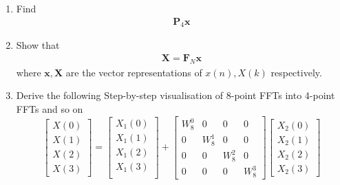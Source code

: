 \documentclass[journal,12pt,twocolumn]{IEEEtran}
\let\vec\mathbf
\renewcommand\thesection{\arabic{section}}
\begin{document}
\begin{enumerate}[label=\arabic*.,ref=\thesection.\theenumi]
\item Find 
    \begin{align}
	     \vec{P}_4 \vec{x}
    \end{align}
\item Show that 
    \begin{align}
	    \vec{X} = \vec{F}_N \vec{x}
	    \label{eq:dft-mat-def}
    \end{align}
		where $\vec{x}, \vec{X}$ are the vector representations of $x(n), X(k)$ respectively.
\item Derive the following Step-by-step visualisation  of
8-point FFTs into 4-point FFTs and so on
\begin{equation}
\begin{bmatrix}
X(0) \\ 
X(1) \\ 
X(2) \\ 
X(3)
\end{bmatrix}
=
\begin{bmatrix}
X_{1}(0) \\ 
X_{1}(1)\\ 
X_{1}(2)\\
X_{1}(3)\\
\end{bmatrix}
+
\begin{bmatrix}
W^{0}_{8} & 0 & 0 & 0\\
0 & W^{1}_{8} & 0 & 0\\
0 & 0 & W^{2}_{8} & 0\\
0 & 0 & 0 & W^{3}_{8}
\end{bmatrix}
\begin{bmatrix}
X_{2}(0) \\ 
X_{2}(1) \\ 
X_{2}(2) \\
X_{2}(3)
\end{bmatrix}
\end{equation}


\end{enumerate}
\end{document}
